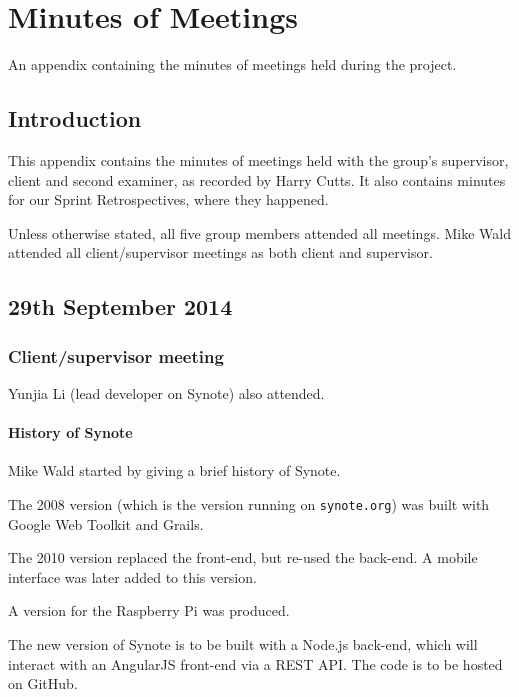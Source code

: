 \chapter{Minutes of Meetings} \label{App:Minutes of Meetings}

\begin{preamble}
	An appendix containing the minutes of meetings held during the project.
\end{preamble}

\section{Introduction}

This appendix contains the minutes of meetings held with the group's supervisor, client and second examiner, as recorded by Harry Cutts. It also contains minutes for our Sprint Retrospectives, where they happened.

Unless otherwise stated, all five group members attended all meetings. Mike Wald attended all client/supervisor meetings as both client and supervisor.

\section{29th September 2014}\label{Minutes:2014-09-29}

\subsection{Client/supervisor meeting}

Yunjia Li (lead developer on Synote) also attended.

\subsubsection{History of Synote}

Mike Wald started by giving a brief history of Synote.

The 2008 version (which is the version running on \texttt{synote.org})
was built with Google Web Toolkit and Grails.

The 2010 version replaced the front-end, but re-used the back-end. A
mobile interface was later added to this version.

A version for the Raspberry Pi was produced.

The new version of Synote is to be built with a Node.js back-end, which
will interact with an AngularJS front-end via a \gls{REST} \gls{API}. The code is to be hosted on GitHub.

